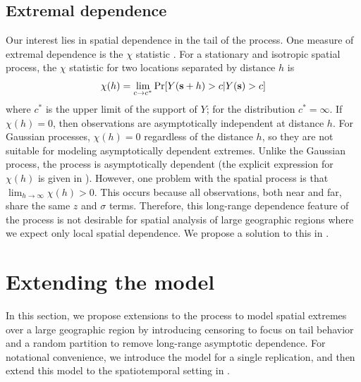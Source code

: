 \subsection{Extremal dependence}\label{sts:extdep}
Our interest lies in spatial dependence in the tail of the \skewt process.
One measure of extremal dependence is the $\chi$ statistic \citep{Coles1999}.
For a stationary and isotropic spatial process, the $\chi$ statistic for two locations separated by distance $h$ is
\begin{align} \label{steq:chih}
  \chi(h) = \lim_{c \rightarrow c^*} \Pr[Y(\mathbf{s} + h) > c | Y(\mathbf{s}) > c]
\end{align}
where $c^*$ is the upper limit of the support of $Y$; for the \skewt distribution $c^* = \infty$.
If $\chi(h) = 0$, then observations are asymptotically independent at distance $h$.
For Gaussian processes, $\chi(h) = 0$ regardless of the distance $h$, so they are not suitable for modeling asymptotically dependent extremes.
Unlike the Gaussian process, the \skewt process is asymptotically dependent (the explicit expression for $\chi(h)$ is given in ).
However, one problem with the spatial \skewt process is that $\displaystyle \lim_{h \rightarrow \infty} \chi(h) > 0$.
This occurs because all observations, both near and far, share the same $z$ and $\sigma$ terms.
Therefore, this long-range dependence feature of the \skewt process is not desirable for spatial analysis of large geographic regions where we expect only local spatial dependence.
We propose a solution to this in .

\section{Extending the model}\label{sts:spatial}
In this section, we propose extensions to the \skewt process to model spatial extremes over a large geographic region by introducing censoring to focus on tail behavior and a random partition to remove long-range asymptotic dependence.
For notational convenience, we introduce the model for a single replication, and then extend this model to the spatiotemporal setting in .

